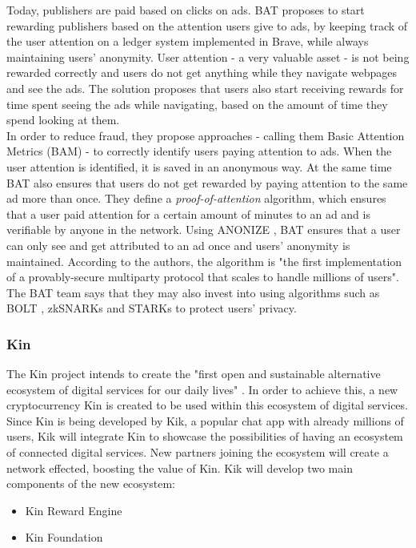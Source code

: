 Today, publishers are paid based on clicks on ads. BAT proposes to start rewarding publishers based on the attention users give to ads, by keeping track of the user attention on a ledger system implemented in Brave, while always maintaining users' anonymity. User attention - a very valuable asset - is not being rewarded correctly and users do not get anything while they navigate webpages and see the ads. The solution proposes that users also start receiving rewards for time spent seeing the ads while navigating, based on the amount of time they spend looking at them. \\

In order to reduce fraud, they propose approaches - calling them Basic Attention Metrics (BAM) - to correctly identify users paying attention to ads. When the user attention is identified, it is saved in an anonymous way. At the same time BAT also ensures that users do not get rewarded by paying attention to the same ad more than once. They define a \textit{proof-of-attention} algorithm, which ensures that a user paid attention for a certain amount of minutes to an ad and is verifiable by anyone in the network. Using \textsf{ANONIZE} \cite{ANONIZE}, BAT ensures that a user can only see and get attributed to an ad once and users' anonymity is maintained. According to the authors, the algorithm is "the first implementation of a provably-secure multiparty protocol that scales to handle millions of users".  The BAT team says that they may also invest into using algorithms such as BOLT \cite{Bolt}, zkSNARKs \cite{ZKSNARK} and STARKs \cite{STARK} to protect users' privacy.

\subsubsection{Kin}

The Kin project intends to create the "first open and sustainable alternative ecosystem of digital services
for our daily lives" \cite{KIN}. In order to achieve this, a new cryptocurrency Kin is created to be used within this ecosystem of digital services. \\

Since Kin is being developed by Kik, a popular chat app with already millions of users, Kik will integrate Kin to showcase the possibilities of having an ecosystem of connected digital services. New partners joining the ecosystem will create a network effected, boosting the value of Kin. Kik will develop two main components of the new ecosystem:
\begin{itemize}
	\item Kin Reward Engine
	\item Kin Foundation
\end{itemize}

